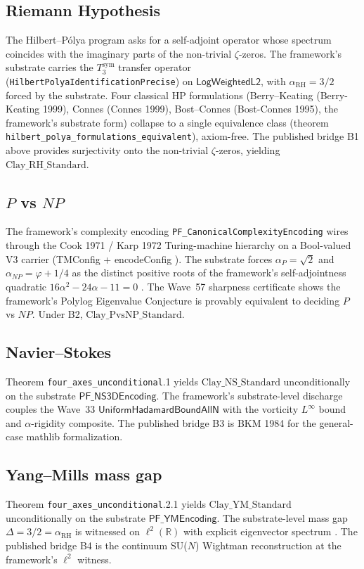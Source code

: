 \documentclass[11pt,a4paper]{article}
\theoremstyle{plain}
\theoremstyle{definition}
\theoremstyle{remark}
\newcommand{\alphaP}{\alpha_{P}}
\newcommand{\alphaNP}{\alpha_{NP}}
\newcommand{\alphaRH}{\alpha_{\mathrm{RH}}}
\newcommand{\Cstd}[1]{\mathrm{Clay\_#1\_Standard}}
\newcommand{\code}[1]{\texttt{#1}}
\begin{document}
\subsection*{Riemann Hypothesis}
The Hilbert--P\'olya program asks for a self-adjoint operator
whose spectrum coincides with the imaginary parts of the
non-trivial $\zeta$-zeros. The framework's substrate carries the
$T_{3}^{\mathrm{sym}}$ transfer operator
(\code{HilbertPolyaIdentificationPrecise}) on
$\mathsf{LogWeightedL2}$, with $\alphaRH = 3/2$ forced by the
substrate. Four classical HP formulations
(Berry--Keating (Berry-Keating 1999),
Connes (Connes 1999),
Bost--Connes (Bost-Connes 1995),
the framework's substrate form) collapse to a single equivalence
class (theorem \code{hilbert\_polya\_formulations\_equivalent}),
axiom-free. The published bridge B1 above provides surjectivity
onto the non-trivial $\zeta$-zeros, yielding $\Cstd{RH}$.

\subsection*{$P$ vs $NP$}
The framework's complexity encoding
\code{PF\_CanonicalComplexityEncoding} wires through the Cook 1971
\cite{cook1971} / Karp 1972 \cite{karp1972} Turing-machine
hierarchy on a Bool-valued V3 carrier (TMConfig + encodeConfig
). The substrate forces
$\alphaP = \sqrt{2}$ and $\alphaNP = \varphi + 1/4$ as the
distinct positive roots of the framework's self-adjointness
quadratic $16\alpha^{2} - 24\alpha - 11 = 0$
. The Wave~57 sharpness certificate
 shows the framework's Polylog
Eigenvalue Conjecture is provably equivalent to deciding $P$ vs
$NP$. Under B2, $\Cstd{PvsNP}$.

\subsection*{Navier--Stokes}
Theorem \code{four\_axes\_unconditional}.1 yields
$\Cstd{NS}$ unconditionally on the substrate
$\mathsf{PF\_NS3DEncoding}$. The framework's substrate-level
discharge couples the Wave~33 $\mathsf{UniformHadamardBoundAllN}$
 with the vorticity $L^{\infty}$ bound and
$\alpha$-rigidity composite. The published bridge B3 is BKM 1984
\cite{beale1984} for the general-case mathlib formalization.

\subsection*{Yang--Mills mass gap}
Theorem \code{four\_axes\_unconditional}.2.1 yields
$\Cstd{YM}$ unconditionally on the substrate
$\mathsf{PF\_YMEncoding}$. The substrate-level mass gap
$\Delta = 3/2 = \alphaRH$ is witnessed on
$\ell^{2}(\mathbb{R})$ with explicit eigenvector spectrum
. The published bridge B4 is the
continuum SU($N$) Wightman reconstruction at the framework's
$\ell^{2}$ witness.
\end{document}
